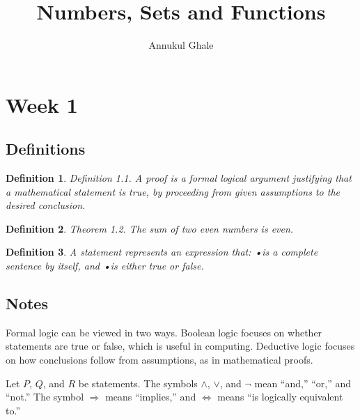 \documentclass[12pt]{article}
\newtheorem{definition}{Definition}
\begin{document}
\title{\textbf{Numbers, Sets and Functions}}
\author{Annukul Ghale}


\maketitle

\tableofcontents
\newpage



\section{Week 1}

\subsection{Definitions}
\begin{definition}
Definition 1.1. A proof is a formal logical argument justifying that a mathematical
statement is true, by proceeding from given assumptions to the desired conclusion.
\end{definition}
\begin{definition}
Theorem 1.2. The sum of two even numbers is even.
\end{definition}

\begin{definition}
A statement represents an expression that:
•is a complete sentence by itself, and
•is either true or false.
\end{definition}

\subsection{Notes}

Formal logic can be viewed in two ways. Boolean logic focuses on whether statements
are true or false, which is useful in computing. Deductive logic focuses on how
conclusions follow from assumptions, as in mathematical proofs.

Let $P$, $Q$, and $R$ be statements. The symbols $\land$, $\lor$, and $\neg$
mean ``and,'' ``or,'' and ``not.'' The symbol $\Rightarrow$ means ``implies,''
and $\Leftrightarrow$ means ``is logically equivalent to.''
\end{document}

